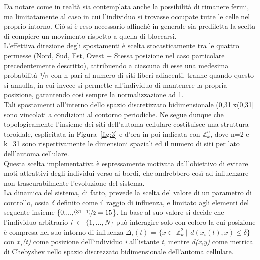 \documentclass{article}
\newcommand{\Zn}{$\mathbb{Z}^n_k$} %
\newcommand{\Zii}{$\mathbb{Z}^2_k$}
\begin{document}
Da notare come in realtà sia contemplata anche la possibilità di rimanere fermi, ma limitatamente al caso in cui l'individuo si trovasse occupate tutte le celle nel proprio intorno. Ciò si è reso necessario affinchè in generale sia prediletta la scelta di compiere un movimento rispetto a quella di bloccarsi.
\\ L'effettiva direzione degli spostamenti è scelta stocasticamente tra le quattro permesse (Nord, Sud, Est, Ovest + Stessa posizione nel caso particolare precedentemente descritto), attribuendo a ciascuna di esse una medesima probabilità $\nicefrac{1}{n}$ con n pari al numero di siti liberi adiacenti, tranne quando questo si annulla, in cui invece si permette all’individuo di mantenere la propria posizione, garantendo così sempre la normalizzazione ad 1.
\\ Tali spostamenti all’interno dello spazio discretizzato bidimensionale (0,31]x(0,31] sono vincolati a condizioni al contorno periodiche. Ne segue dunque che topologicamente l’insieme dei siti dell’automa cellulare costituisce una struttura toroidale, esplicitata in Figura~\ref{fig:3} e d'ora in poi indicata con \Zn, dove n=2 e k=31 sono rispettivamente le dimensioni spaziali ed il numero di siti per lato dell'automa cellulare.
\\ Questa scelta implementativa è espressamente motivata dall’obiettivo di evitare moti attrattivi degli individui verso ai bordi, che andrebbero così ad influenzare non trascurabilmente l’evoluzione del sistema.
\\ La dinamica del sistema, di fatto, prevede la scelta del valore di un parametro di controllo, ossia $\delta$ definito come il raggio di influenza, e limitato agli elementi del seguente insieme \{0,...,$\nicefrac{(31-1)}{2}=15$\}. In base al suo valore si decide che l'individuo arbitrario \textit{i} $\in$ $\{1,...,\textit{N} \}$ può interagire solo con coloro la cui posizione è compresa nel suo intorno di influenza $\Delta_{i}(t)$ = $\{ x \in \ $\Zii$ \ | \  \ d(x_{i}(t),x)\leqslant \delta \}$ con \textit{$x_{i}$(t)} come posizione dell'individuo \textit{i} all'istante \textit{t}, mentre \textit{d(x,y)} come metrica di Chebyshev nello spazio discrezzato bidimensionale dell'automa cellulare. 
\end{document}
